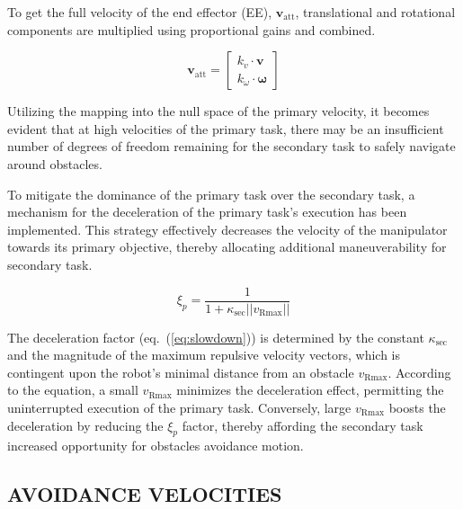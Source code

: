 \documentclass[letterpaper, 10 pt, conference]{ieeeconf}  %
\begin{document}
To get the full velocity of the end effector (EE), \( \mathrm{\mathbf{v}_{att}} \), translational and rotational components are multiplied using proportional gains and combined.

\begin{equation}
	\mathrm{\mathbf{v}_{att}} = 
	\begin{bmatrix}
		k_{v} \cdot \mathbf{v}   \\
		k_{\omega} \cdot \mathbf{\omega}
	\end{bmatrix}
	\label{eq:ee_velocity}
\end{equation}

Utilizing the mapping into the null space of the primary velocity, it becomes evident that at high velocities of the primary task, there may be an insufficient number of degrees of freedom remaining for the secondary task to safely navigate around obstacles. 


\label{chap:primary slowdown}

To mitigate the dominance of the primary task over the secondary task, a mechanism for the deceleration of the primary task's execution has been implemented. This strategy effectively decreases the velocity of the manipulator towards its primary objective, thereby allocating additional maneuverability for secondary task.

\begin{equation}
	\label{eq:slowdown}
	\xi_{p}=
	\frac{1}{1 + \kappa_{\text{sec}} ||v_{\text{Rmax}}||}
\end{equation}

The deceleration factor (eq.~(\ref{eq:slowdown})) is determined by the constant \( \kappa_{\text{sec}} \) and the magnitude of the maximum repulsive velocity vectors, which is contingent upon the robot's minimal distance from an obstacle \( v_{\text{Rmax}} \). According to the equation, a small \( v_{\text{Rmax}} \) minimizes the deceleration effect, permitting the uninterrupted execution of the primary task. Conversely, large \( v_{\text{Rmax}} \) boosts the deceleration by reducing the $\xi_{p}$ factor, thereby affording the secondary task increased opportunity for obstacles avoidance motion.


\subsection{AVOIDANCE VELOCITIES}
\end{document}
